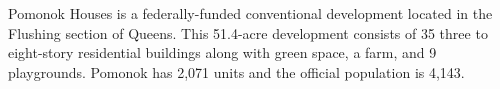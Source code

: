 Pomonok Houses is a federally-funded conventional development located in the Flushing section of Queens. This 51.4-acre development consists of 35 three to eight-story residential buildings along with green space, a farm, and 9 playgrounds. Pomonok has 2,071 units and the official population is 4,143.